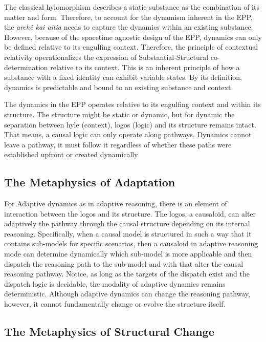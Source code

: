 The classical hylomorphism describes a static substance as the combination of its matter and form. Therefore, to account for the dynamism inherent in the EPP, the \textit{archê kai aitia} needs to capture the dynamics within an existing substance. However, because of the spacetime agnostic design of the EPP, dynamics can only be defined relative to its engulfing context. Therefore, the principle of contextual relativity operationalizes the expression of Substantial-Structural co-determination relative to its context. This is an inherent  principle of how a substance with a fixed identity can exhibit variable states. By its definition, dynamics is predictable and bound to an existing substance and context. 

The dynamics in the EPP operates relative to its engulfing context and within its structure. The structure might be static or dynamic, but for dynamic the separation between hyle (context), logos (logic) and its structure remains intact. That means, a causal logic can only operate along pathways. Dynamics cannot leave a pathway, it must follow it regardless of whether these paths were established upfront or created dynamically

\subsection{The Metaphysics of Adaptation} 
\label{sec:metaphysics_adaptation}

 For Adaptive dynamics as in adaptive reasoning, there is an element of interaction between the logos and its structure. The logos, a causaloid, can alter adaptively the pathway through the causal structure depending on its internal reasoning. Specifically, when a causal model is structured in such a way that it contains sub-models for specific scenarios, then a causaloid in adaptive reasoning mode can determine dynamically which sub-model is more applicable and then dispatch the reasoning path to the sub-model and with that alter the causal reasoning pathway. Notice, as long as the targets of the dispatch exist and the dispatch logic is decidable, the modality of adaptive dynamics remains deterministic. Although adaptive dynamics can change the reasoning pathway, however, it cannot fundamentally change or evolve the structure itself.  


\subsection{The Metaphysics of Structural Change} 
\label{sec:metaphysics_structural_change}

